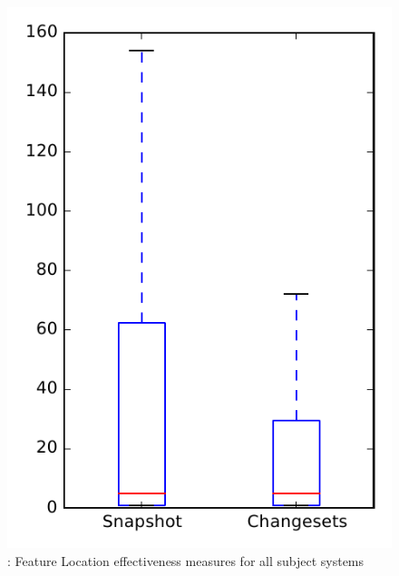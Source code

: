 
\begin{figure}
\centering
\includegraphics[height=0.4\textheight]{figures/flt/rq1_overview_no_outlier}
\caption{\fone: Feature Location effectiveness measures for all subject systems}
\label{fig:flt:rq1:overview}
\end{figure}
